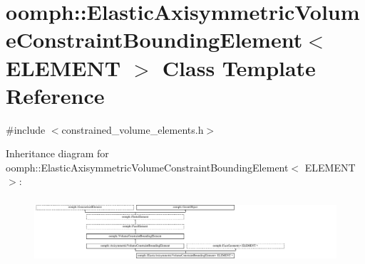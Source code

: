 \hypertarget{classoomph_1_1ElasticAxisymmetricVolumeConstraintBoundingElement}{}\section{oomph\+:\+:Elastic\+Axisymmetric\+Volume\+Constraint\+Bounding\+Element$<$ E\+L\+E\+M\+E\+NT $>$ Class Template Reference}
\label{classoomph_1_1ElasticAxisymmetricVolumeConstraintBoundingElement}


{\ttfamily \#include $<$constrained\+\_\+volume\+\_\+elements.\+h$>$}

Inheritance diagram for oomph\+:\+:Elastic\+Axisymmetric\+Volume\+Constraint\+Bounding\+Element$<$ E\+L\+E\+M\+E\+NT $>$\+:\begin{figure}[H]
\begin{center}
\leavevmode
\includegraphics[height=2.477876cm]{classoomph_1_1ElasticAxisymmetricVolumeConstraintBoundingElement}
\end{center}
\end{figure}
